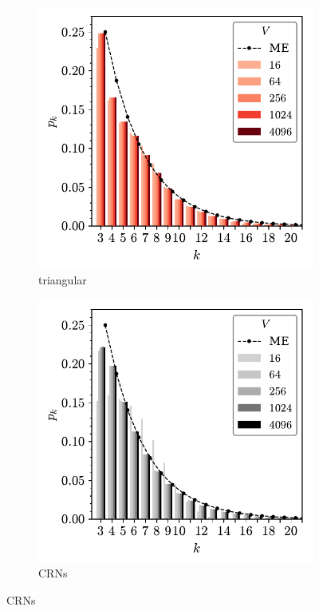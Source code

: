 \begin{figure}[btp]
     \vspace{0.5cm}
     \begin{subfigure}[b]{0.40\textwidth}
         \centering
         \includegraphics[width=\textwidth]{./figures/procrystals/tri3_pk.pdf}
         \caption{triangular}
         \label{fig:pro3pke}
     \end{subfigure}
     \hfill
      \begin{subfigure}[b]{0.40\textwidth}
         \centering
         \includegraphics[width=\textwidth]{./figures/procrystals/netmc_pk.pdf}
         \caption{CRNs}
         \label{fig:pro3pkf}
     \end{subfigure}
     \hfill
    

\end{figure}
